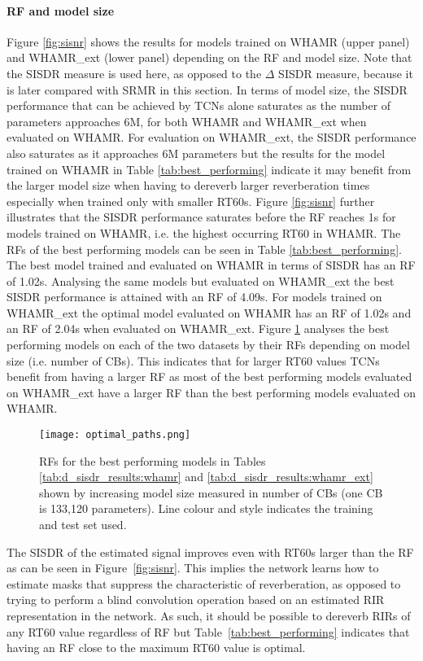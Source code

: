 \documentclass[conference,a4paper]{IEEEtran}
\begin{document}
\paragraph{\ac{RF} and model size}
Figure \ref{fig:sisnr} shows the results for models trained on WHAMR (upper panel) and WHAMR\_ext (lower panel) depending on the \ac{RF} and model size. Note that the \ac{SISDR} measure is used here, as opposed to the $\Delta$ \ac{SISDR} measure, because it is later compared with \ac{SRMR} in this section. 
In terms of model size, the \ac{SISDR} performance that can be achieved by TCNs alone saturates as the number of parameters approaches 
6M, for both WHAMR and WHAMR\_ext when evaluated on WHAMR. For evaluation on WHAMR\_ext, the \ac{SISDR} performance also saturates as it approaches 6M parameters but the results for the model trained on WHAMR in Table \ref{tab:best_performing} indicate it may benefit from the larger model size when having to dereverb larger reverberation times especially when trained only with smaller RT60s.
Figure \ref{fig:sisnr} further illustrates that the \ac{SISDR} performance saturates before the \ac{RF} reaches 1s for models trained on WHAMR, i.e. the highest occurring RT60 in WHAMR. The \Acp{RF} of the best performing models can be seen in Table \ref{tab:best_performing}. The best model trained and evaluated on WHAMR in terms of \ac{SISDR} has an \ac{RF} of 1.02s. Analysing the same models but evaluated on WHAMR\_ext the best \ac{SISDR} performance is attained with an \ac{RF} of 4.09s. 
For models trained on WHAMR\_ext the optimal model evaluated on WHAMR has an \ac{RF} of 1.02s and an \ac{RF} of 2.04s when evaluated on WHAMR\_ext.
Figure \ref{fig:rfs_cbs} analyses the best performing models on each of the two datasets by their \Acp{RF} depending on model size (i.e. number of \Acp{CB}).
This indicates that for larger RT60 values \acp{TCN} benefit from having a larger \ac{RF} as most of the best performing models evaluated on WHAMR\_ext have a larger \ac{RF} than the best performing models evaluated on WHAMR.
\begin{figure}
    \centering
    \texttt{[image: optimal\_paths.png]}
    \caption{\acp{RF} for the best performing models in Tables \ref{tab:d_sisdr_results:whamr} and \ref{tab:d_sisdr_results:whamr_ext} shown by increasing model size measured in number of \acp{CB} (one \ac{CB} is 133,120 parameters). Line colour and style indicates the training and test set used.}
    \label{fig:rfs_cbs}
\end{figure}
The \ac{SISDR} of the estimated signal improves even with RT60s larger than the \ac{RF} as can be seen in Figure~\ref{fig:sisnr}. This implies the network learns how to estimate masks that suppress the characteristic of reverberation, as opposed to trying to perform a blind convolution operation based on an estimated \ac{RIR} representation in the network. As such, it should be possible to dereverb \Acp{RIR} of any RT60 value regardless of \ac{RF} but Table~\ref{tab:best_performing} indicates that having an \ac{RF} close to the maximum RT60 value is optimal.
\end{document}
